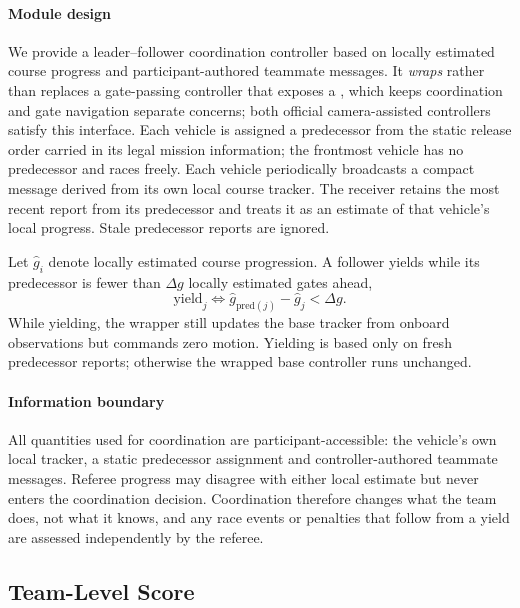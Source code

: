 \paragraph{Module design} We provide a leader--follower coordination controller
based on locally estimated course progress and participant-authored teammate
messages. It \emph{wraps} rather than replaces a
gate-passing controller that exposes a , which keeps
coordination and gate navigation separate concerns; both official
camera-assisted controllers satisfy this interface. Each vehicle is assigned a
predecessor from the static release order carried in its legal mission
information; the frontmost vehicle has no predecessor and races freely. Each
vehicle periodically broadcasts a compact message derived from its own local
course tracker. The receiver retains the most recent report from its predecessor
and treats it as an estimate of that vehicle's local progress. Stale predecessor
reports are ignored.

Let $\hat g_i$ denote locally estimated course progression. A follower yields
while its predecessor is fewer than $\Delta g$ locally estimated gates ahead,
\begin{equation}
\label{eq:yield}
\text{yield}_j \iff \hat g_{\mathrm{pred}(j)}-\hat g_j<\Delta g .
\end{equation}
While yielding, the wrapper still updates the base tracker from onboard
observations but commands zero motion. Yielding is based only on fresh
predecessor reports; otherwise the wrapped base controller runs unchanged.

\paragraph{Information boundary} All quantities used for coordination are
participant-accessible: the vehicle's own local tracker, a static predecessor
assignment and controller-authored teammate messages. Referee progress may
disagree with either local estimate but never enters the coordination decision.
Coordination therefore changes what the team does, not what it knows, and any
race events or penalties that follow from a yield are assessed independently by
the referee.

\subsection{Team-Level Score}

